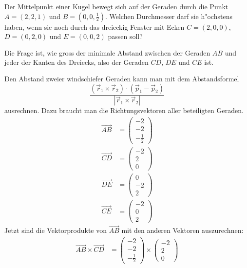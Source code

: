 Der Mittelpunkt einer Kugel bewegt sich auf der Geraden durch
die Punkt $A=(2,2,1)$ und $B=(0,0,\frac12)$. Welchen Durchmesser
darf sie h"ochstens haben, wenn sie noch durch das dreieckig
Fenster mit Ecken $C=(2,0,0)$, $D=(0,2,0)$ und $E=(0,0,2)$ passen
soll?

\begin{loesung}
Die Frage ist, wie gross der minimale Abstand zwischen
der Geraden $AB$ und jeder der Kanten des Dreiecks, also
der Geraden $CD$, $DE$ und $CE$ ist.

Den Abstand zweier windschiefer Geraden kann man mit dem
Abstandsformel
\[
\frac{(\vec r_1\times \vec r_2)\cdot (\vec p_1-\vec p_2)}{|\vec r_1\times \vec r_2|}
\]
ausrechnen.
Dazu braucht man die Richtungsvektoren aller beteiligten Geraden.
\begin{align*}
\overrightarrow{AB}
&=
\begin{pmatrix} -2\\-2\\-\frac12 \end{pmatrix}
\\
\overrightarrow{CD}
&=
\begin{pmatrix} -2\\2\\0\end{pmatrix}
\\
\overrightarrow{DE}
&=
\begin{pmatrix} 0\\-2\\2\end{pmatrix}
\\
\overrightarrow{CE}
&=
\begin{pmatrix} -2\\0\\2\end{pmatrix}
\end{align*}
Jetzt sind die Vektorprodukte von $\overrightarrow{AB}$ mit den
anderen Vektoren auszurechnen:
\begin{align*}
\overrightarrow{AB}\times\overrightarrow{CD}
&=
\begin{pmatrix} -2\\-2\\-\frac12 \end{pmatrix}
\times
\begin{pmatrix} -2\\2\\0\end{pmatrix}

\end{align*}
\end{loesung}
